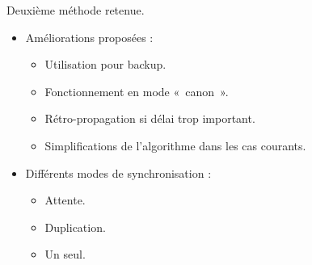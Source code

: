 \begin{frame}
	Deuxième méthode retenue.
	
	\begin{itemize}
		\item[\textbullet] Améliorations proposées : 
			\begin{itemize}
				\item Utilisation pour backup.
				\item Fonctionnement en mode «~canon~».
				\item Rétro-propagation si délai trop important.
				\item Simplifications de l'algorithme dans les cas courants.
			\end{itemize}
		\vspace{1em}
		\item[\textbullet] Différents modes de synchronisation : 
			\begin{itemize}
				\item Attente.
				\item Duplication.
				\item Un seul.
			\end{itemize}
	\end{itemize}
	
\end{frame}